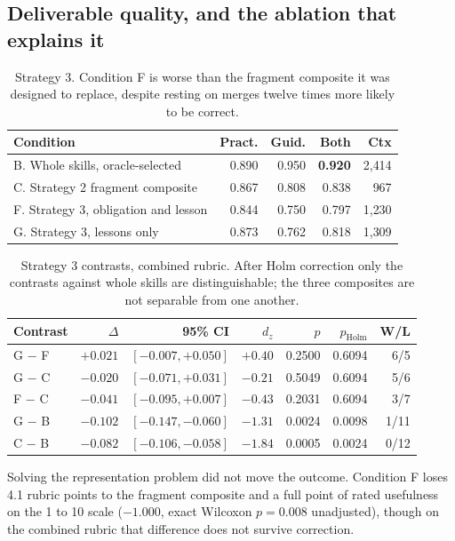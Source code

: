 \documentclass[11pt]{article}
\begin{document}
\subsection{Deliverable quality, and the ablation that explains it}

\begin{table}[t]\centering\small
\begin{tabular}{lrrrr}
\toprule
Condition & Pract. & Guid. & Both & Ctx \\
\midrule
B. Whole skills, oracle-selected & 0.890 & 0.950 & \textbf{0.920} & 2{,}414 \\
C. Strategy 2 fragment composite & 0.867 & 0.808 & 0.838 & 967 \\
F. Strategy 3, obligation and lesson & 0.844 & 0.750 & 0.797 & 1{,}230 \\
G. Strategy 3, lessons only & 0.873 & 0.762 & 0.818 & 1{,}309 \\
\bottomrule
\end{tabular}
\caption{Strategy 3. Condition F is worse than the fragment composite it was designed to replace,
despite resting on merges twelve times more likely to be correct.}
\label{tab:s3main}
\end{table}

\begin{table}[t]\centering\small
\begin{tabular}{lrrrrrr}
\toprule
Contrast & $\Delta$ & 95\% CI & $d_z$ & $p$ & $p_{\text{Holm}}$ & W/L \\
\midrule
G $-$ F & $+0.021$ & $[-0.007, +0.050]$ & $+0.40$ & 0.2500 & 0.6094 & 6/5 \\
G $-$ C & $-0.020$ & $[-0.071, +0.031]$ & $-0.21$ & 0.5049 & 0.6094 & 5/6 \\
F $-$ C & $-0.041$ & $[-0.095, +0.007]$ & $-0.43$ & 0.2031 & 0.6094 & 3/7 \\
G $-$ B & $-0.102$ & $[-0.147, -0.060]$ & $-1.31$ & 0.0024 & 0.0098 & 1/11 \\
C $-$ B & $-0.082$ & $[-0.106, -0.058]$ & $-1.84$ & 0.0005 & 0.0024 & 0/12 \\
\bottomrule
\end{tabular}
\caption{Strategy 3 contrasts, combined rubric. After Holm correction only the contrasts against
whole skills are distinguishable; the three composites are not separable from one another.}
\label{tab:s3contrasts}
\end{table}

Solving the representation problem did not move the outcome. Condition F loses 4.1 rubric points to
the fragment composite and a full point of rated usefulness on the 1 to 10 scale
($-1.000$, exact Wilcoxon $p = 0.008$ unadjusted), though on the combined rubric that difference
does not survive correction.
\end{document}
